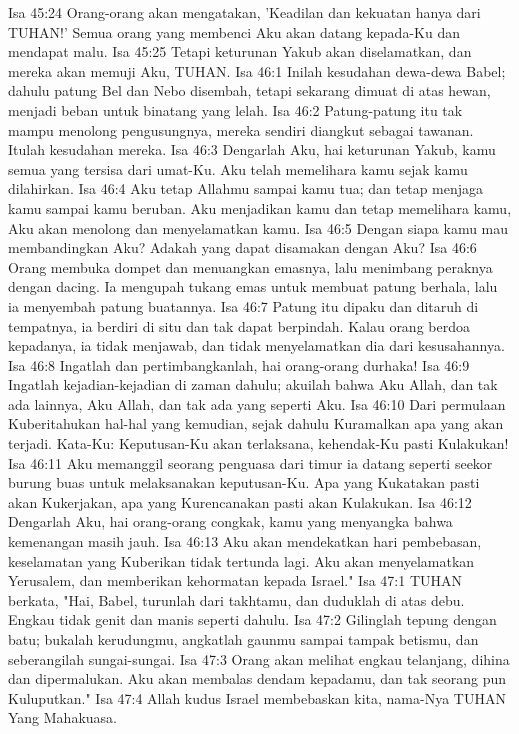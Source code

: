 Isa 45:24  Orang-orang akan mengatakan, 'Keadilan dan kekuatan hanya dari TUHAN!' Semua orang yang membenci Aku akan datang kepada-Ku dan mendapat malu.
Isa 45:25  Tetapi keturunan Yakub akan diselamatkan, dan mereka akan memuji Aku, TUHAN.
Isa 46:1  Inilah kesudahan dewa-dewa Babel; dahulu patung Bel dan Nebo disembah, tetapi sekarang dimuat di atas hewan, menjadi beban untuk binatang yang lelah.
Isa 46:2  Patung-patung itu tak mampu menolong pengusungnya, mereka sendiri diangkut sebagai tawanan. Itulah kesudahan mereka.
Isa 46:3  Dengarlah Aku, hai keturunan Yakub, kamu semua yang tersisa dari umat-Ku. Aku telah memelihara kamu sejak kamu dilahirkan.
Isa 46:4  Aku tetap Allahmu sampai kamu tua; dan tetap menjaga kamu sampai kamu beruban. Aku menjadikan kamu dan tetap memelihara kamu, Aku akan menolong dan menyelamatkan kamu.
Isa 46:5  Dengan siapa kamu mau membandingkan Aku? Adakah yang dapat disamakan dengan Aku?
Isa 46:6  Orang membuka dompet dan menuangkan emasnya, lalu menimbang peraknya dengan dacing. Ia mengupah tukang emas untuk membuat patung berhala, lalu ia menyembah patung buatannya.
Isa 46:7  Patung itu dipaku dan ditaruh di tempatnya, ia berdiri di situ dan tak dapat berpindah. Kalau orang berdoa kepadanya, ia tidak menjawab, dan tidak menyelamatkan dia dari kesusahannya.
Isa 46:8  Ingatlah dan pertimbangkanlah, hai orang-orang durhaka!
Isa 46:9  Ingatlah kejadian-kejadian di zaman dahulu; akuilah bahwa Aku Allah, dan tak ada lainnya, Aku Allah, dan tak ada yang seperti Aku.
Isa 46:10  Dari permulaan Kuberitahukan hal-hal yang kemudian, sejak dahulu Kuramalkan apa yang akan terjadi. Kata-Ku: Keputusan-Ku akan terlaksana, kehendak-Ku pasti Kulakukan!
Isa 46:11  Aku memanggil seorang penguasa dari timur ia datang seperti seekor burung buas untuk melaksanakan keputusan-Ku. Apa yang Kukatakan pasti akan Kukerjakan, apa yang Kurencanakan pasti akan Kulakukan.
Isa 46:12  Dengarlah Aku, hai orang-orang congkak, kamu yang menyangka bahwa kemenangan masih jauh.
Isa 46:13  Aku akan mendekatkan hari pembebasan, keselamatan yang Kuberikan tidak tertunda lagi. Aku akan menyelamatkan Yerusalem, dan memberikan kehormatan kepada Israel."
Isa 47:1  TUHAN berkata, "Hai, Babel, turunlah dari takhtamu, dan duduklah di atas debu. Engkau tidak genit dan manis seperti dahulu.
Isa 47:2  Gilinglah tepung dengan batu; bukalah kerudungmu, angkatlah gaunmu sampai tampak betismu, dan seberangilah sungai-sungai.
Isa 47:3  Orang akan melihat engkau telanjang, dihina dan dipermalukan. Aku akan membalas dendam kepadamu, dan tak seorang pun Kuluputkan."
Isa 47:4  Allah kudus Israel membebaskan kita, nama-Nya TUHAN Yang Mahakuasa.
